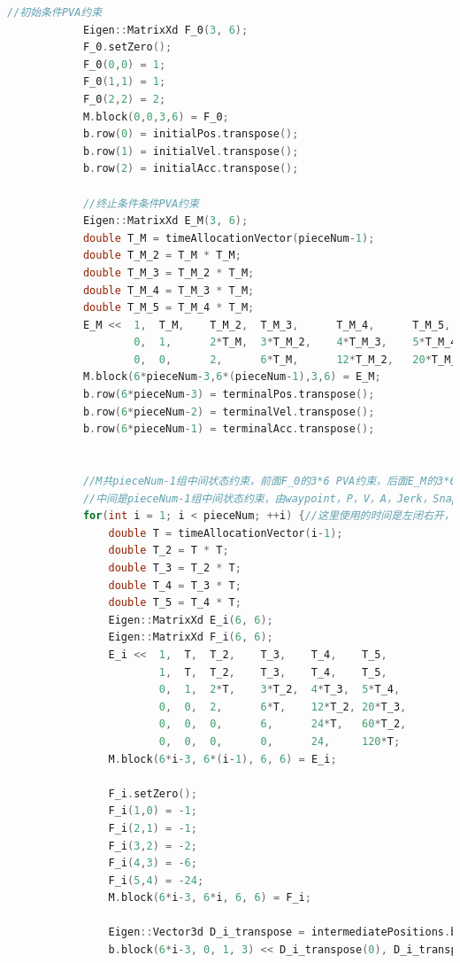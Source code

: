 \documentclass[40pt,a4paper,UTF8,twocolumn]{ctexart}%
\numberwithin{equation}{section}
\begin{document}
\begin{lstlisting}[language=C++, caption=click\_gen.cpp/minimumJerkTrajGen()]
            //初始条件PVA约束
            Eigen::MatrixXd F_0(3, 6);
            F_0.setZero();
            F_0(0,0) = 1;
            F_0(1,1) = 1;
            F_0(2,2) = 2;
            M.block(0,0,3,6) = F_0;
            b.row(0) = initialPos.transpose();
            b.row(1) = initialVel.transpose();
            b.row(2) = initialAcc.transpose();
        
            //终止条件条件PVA约束
            Eigen::MatrixXd E_M(3, 6);
            double T_M = timeAllocationVector(pieceNum-1);
            double T_M_2 = T_M * T_M;
            double T_M_3 = T_M_2 * T_M;
            double T_M_4 = T_M_3 * T_M;
            double T_M_5 = T_M_4 * T_M;
            E_M <<  1,  T_M,    T_M_2,  T_M_3,      T_M_4,      T_M_5,
                    0,  1,      2*T_M,  3*T_M_2,    4*T_M_3,    5*T_M_4,
                    0,  0,      2,      6*T_M,      12*T_M_2,   20*T_M_3;
            M.block(6*pieceNum-3,6*(pieceNum-1),3,6) = E_M;
            b.row(6*pieceNum-3) = terminalPos.transpose();
            b.row(6*pieceNum-2) = terminalVel.transpose();
            b.row(6*pieceNum-1) = terminalAcc.transpose();
        
        
            //M共pieceNum-1组中间状态约束，前面F_0的3*6 PVA约束，后面E_M的3*6 PVA约束，
            //中间是pieceNum-1组中间状态约束，由waypoint，P，V，A，Jerk，Snap连续可导组成的E_i(6*6)，F_i(6*6)约束
            for(int i = 1; i < pieceNum; ++i) {//这里使用的时间是左闭右开，中间点约束在左边点上，所以是从第[1]个而非第[0]个开始
                double T = timeAllocationVector(i-1);
                double T_2 = T * T;
                double T_3 = T_2 * T;
                double T_4 = T_3 * T;
                double T_5 = T_4 * T;
                Eigen::MatrixXd E_i(6, 6);
                Eigen::MatrixXd F_i(6, 6);
                E_i <<  1,  T,  T_2,    T_3,    T_4,    T_5,
                        1,  T,  T_2,    T_3,    T_4,    T_5,
                        0,  1,  2*T,    3*T_2,  4*T_3,  5*T_4,
                        0,  0,  2,      6*T,    12*T_2, 20*T_3,
                        0,  0,  0,      6,      24*T,   60*T_2,
                        0,  0,  0,      0,      24,     120*T;
                M.block(6*i-3, 6*(i-1), 6, 6) = E_i;
        
                F_i.setZero();
                F_i(1,0) = -1;
                F_i(2,1) = -1;
                F_i(3,2) = -2;
                F_i(4,3) = -6;
                F_i(5,4) = -24;
                M.block(6*i-3, 6*i, 6, 6) = F_i;
        
                Eigen::Vector3d D_i_transpose = intermediatePositions.block(0,i-1,3,1);
                b.block(6*i-3, 0, 1, 3) << D_i_transpose(0), D_i_transpose(1), D_i_transpose(2);
        

\end{lstlisting}
\end{document}
